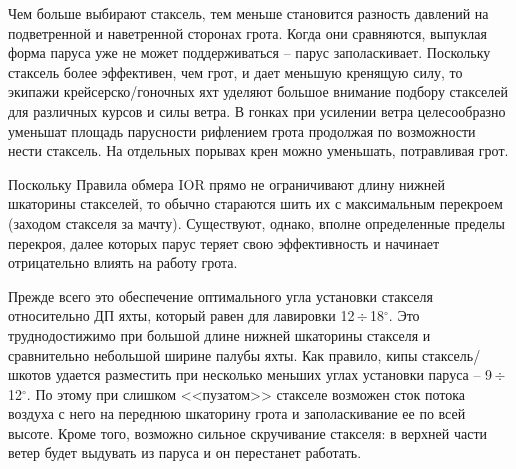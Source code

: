 \documentclass[a4paper, 12pt, twoside, final, book, russian, fittopage, cyremdash]{ncc}
\newcommand{\gr}{\ensuremath{^\circ}\xspace}
\newcommand{\otdo}{\,\ensuremath{\div}\,}
\begin{document}
Чем больше выбирают стаксель, тем меньше становится разность давлений на подветренной и наветренной сторонах грота. Когда они сравняются, выпуклая форма паруса уже не может поддерживаться \--- парус заполаскивает. Поскольку стаксель более эффективен, чем грот, и дает меньшую кренящую силу, то экипажи крейсерско\-/гоночных яхт уделяют большое внимание подбору стакселей для различных курсов и силы ветра. В гонках при усилении ветра целесообразно уменьшат площадь парусности рифлением грота продолжая по возможности нести стаксель. На отдельных порывах крен можно уменьшать, потравливая грот.

Поскольку Правила обмера IOR прямо не ограничивают длину нижней шкаторины стакселей, то обычно стараются шить их с максимальным перекроем (заходом стакселя за мачту). Существуют, однако, вполне определенные пределы перекроя, далее которых парус теряет свою эффективность и начинает отрицательно влиять на работу грота.

Прежде всего это обеспечение оптимального угла установки стакселя относительно ДП яхты, который равен для лавировки 12\otdo 18\gr. Это труднодостижимо при большой длине нижней шкаторины стакселя и сравнительно небольшой ширине палубы яхты. Как правило, кипы стаксель\-/шкотов удается разместить при несколько меньших углах установки паруса \--- 9\otdo 12\gr. По этому при слишком <<пузатом>> стакселе возможен сток потока воздуха с него на переднюю шкаторину грота и заполаскивание ее по всей высоте. Кроме того, возможно сильное скручивание стакселя: в верхней части ветер будет выдувать из паруса и он перестанет работать. 
\end{document}
